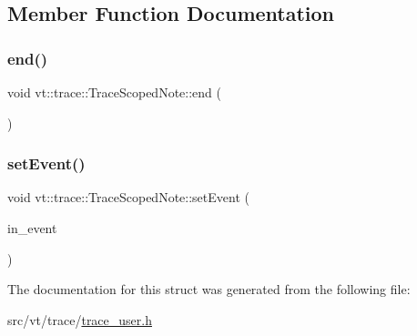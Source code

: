 \subsection{Member Function Documentation}
\mbox{\label{structvt_1_1trace_1_1_trace_scoped_note_abfffe38b863ed36f508a3aecef7c094b}} 
\subsubsection{\texorpdfstring{end()}{end()}}
{\footnotesize\ttfamily void vt\+::trace\+::\+Trace\+Scoped\+Note\+::end (\begin{DoxyParamCaption}{ }\end{DoxyParamCaption})\hspace{0.3cm}{\ttfamily [inline]}}

\mbox{\label{structvt_1_1trace_1_1_trace_scoped_note_acc768c8b812ee315650585887c4893f4}} 
\subsubsection{\texorpdfstring{set\+Event()}{setEvent()}}
{\footnotesize\ttfamily void vt\+::trace\+::\+Trace\+Scoped\+Note\+::set\+Event (\begin{DoxyParamCaption}\item[{\mbox{[}\mbox{[}maybe\+\_\+unused\mbox{]} \mbox{]} \hyperlink{namespacevt_1_1trace_a64a7185f3e102df8d8258f263ccd1582}{Trace\+Event\+I\+D\+Type} const}]{in\+\_\+event }\end{DoxyParamCaption})\hspace{0.3cm}{\ttfamily [inline]}}



The documentation for this struct was generated from the following file\+:\begin{DoxyCompactItemize}
\item 
src/vt/trace/\hyperlink{trace__user_8h}{trace\+\_\+user.\+h}\end{DoxyCompactItemize}
